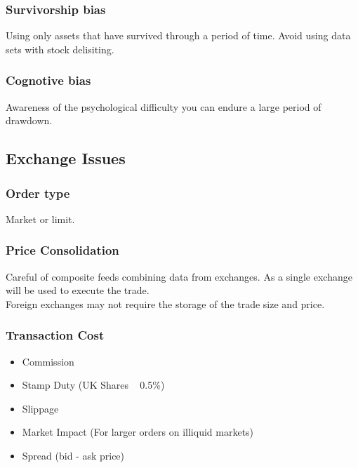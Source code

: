 \documentclass[11pt]{scrartcl} %
\begin{document}
\subsubsection{Survivorship bias}

Using only assets that have survived through a period of time. Avoid using data sets with stock delisiting.

\subsubsection{Cognotive bias}

Awareness of the psychological difficulty you can endure a large period of drawdown.

\subsection{Exchange Issues}

\subsubsection{Order type}

Market or limit.

\subsubsection{Price Consolidation}

Careful of composite feeds combining data from exchanges. As a single exchange will be used
to execute the trade.\\

Foreign exchanges may not require the storage of the trade size and price.

\subsubsection{Transaction Cost}

\begin{itemize}
	\item Commission
	\item Stamp Duty (UK Shares ~ 0.5\%)
	\item Slippage
	\item Market Impact (For larger orders on illiquid markets)
	\item Spread (bid - ask price)
\end{itemize}

\end{document}
